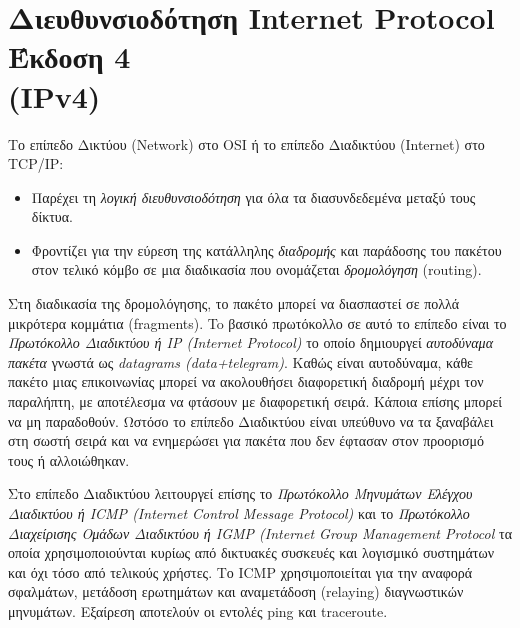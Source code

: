 %
%
\section{Διευθυνσιοδότηση Internet Protocol Έκδοση 4\\ (IPv4)}
Το επίπεδο Δικτύου (Network) στο OSI ή το επίπεδο Διαδικτύου (Internet) στο TCP/IP:

\begin{itemize}
\item Παρέχει τη \emph{λογική διευθυνσιοδότηση} για όλα τα διασυνδεδεμένα μεταξύ τους δίκτυα.
\item Φροντίζει για την εύρεση της κατάλληλης \emph{διαδρομής} και παράδοσης του πακέτου στον τελικό κόμβο σε μια διαδικασία που ονομάζεται \emph{δρομολόγηση} (routing).
\end{itemize}

Στη διαδικασία της δρομολόγησης, το πακέτο μπορεί να διασπαστεί σε πολλά μικρότερα κομμάτια (fragments).  To βασικό πρωτόκολλο σε αυτό το επίπεδο είναι το \emph{Πρωτόκολλο Διαδικτύου ή IP (Internet Protocol)} το οποίο δημιουργεί \emph{αυτοδύναμα πακέτα} γνωστά ως \emph{datagrams (data+telegram)}. Καθώς είναι αυτοδύναμα, κάθε πακέτο μιας επικοινωνίας μπορεί να ακολουθήσει διαφορετική διαδρομή μέχρι τον παραλήπτη, με αποτέλεσμα να φτάσουν με διαφορετική σειρά. Κάποια επίσης μπορεί να μη παραδοθούν. Ωστόσο το επίπεδο Διαδικτύου είναι υπεύθυνο να τα ξαναβάλει στη σωστή σειρά και να ενημερώσει για πακέτα που δεν έφτασαν στον προορισμό τους ή αλλοιώθηκαν.    

Στο επίπεδο Διαδικτύου λειτουργεί επίσης το \emph{Πρωτόκολλο Μηνυμάτων Ελέγχου Διαδικτύου ή ICMP (Internet Control Message Protocol)} και το \emph{Πρωτόκολλο Διαχείρισης Ομάδων Διαδικτύου ή IGMP (Internet Group Management Protocol} τα οποία χρησιμοποιούνται κυρίως από δικτυακές συσκευές και λογισμικό συστημάτων και όχι τόσο από τελικούς χρήστες. Το ICMP χρησιμοποιείται για την αναφορά σφαλμάτων, μετάδοση ερωτημάτων και αναμετάδοση (relaying) διαγνωστικών μηνυμάτων. Εξαίρεση αποτελούν οι εντολές ping και traceroute.

